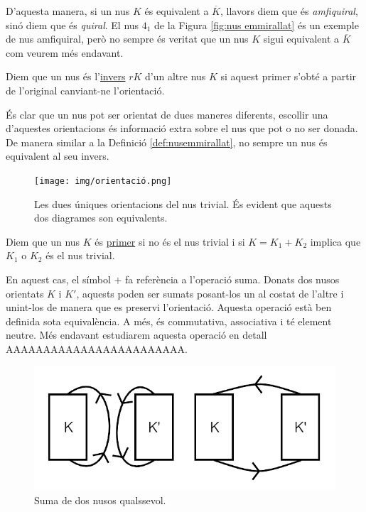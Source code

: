 D'aquesta manera, si un nus $K$ és equivalent a $\overline{K}$, llavors diem que és \textit{amfiquiral}, sinó diem que és \textit{quiral}. El nus $4_1$ de la Figura \ref{fig:nus emmirallat} és un exemple de nus amfiquiral, però no sempre és veritat que un nus $K$ sigui equivalent a $\overline{K}$ com veurem més endavant.

\begin{definition}\label{def:nusinvers}
	Diem que un nus és l'\underline{invers} $rK$ d'un altre nus $K$ si aquest primer s'obté a partir de l'original canviant-ne l'orientació.
\end{definition}

És clar que un nus pot ser orientat de dues maneres diferents, escollir una d'aquestes orientacions és informació extra sobre el nus que pot o no ser donada. De manera similar a la Definició \ref{def:nusemmirallat}, no sempre un nus és equivalent al  seu invers.

\begin{figure}
	\centering
	\texttt{[image: img/orientació.png]}
	\caption{Les dues úniques orientacions del nus trivial. És evident que aquests dos diagrames son equivalents.}\label{fig:nusorientat}
\end{figure}

\begin{definition}
	Diem que un nus $K$ és \underline{primer} si no és el nus trivial i si $K=K_1+K_2$ implica que $K_1$ o $K_2$ és el nus trivial.
\end{definition}

En aquest cas, el símbol $+$ fa referència a l'operació suma. Donats dos nusos orientats $K$ i $K'$, aquests poden ser sumats posant-los un al costat de l'altre i unint-los de manera que es preservi l'orientació. Aquesta operació està ben definida sota equivalència. A més, és commutativa, associativa i té element neutre. Més endavant estudiarem aquesta operació en detall AAAAAAAAAAAAAAAAAAAAAAAA.\\

\begin{figure}
	\centering
	\includegraphics[width=0.9\linewidth]{img/nussuma.png}
	\caption{Suma de dos nusos qualssevol.}\label{fig:nussuma}
\end{figure}

